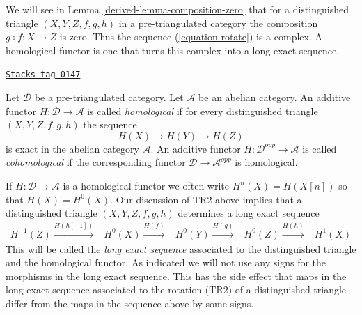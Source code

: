 \medskip\noindent
We will see in
Lemma \ref{derived-lemma-composition-zero}
that for a distinguished triangle $(X, Y, Z, f, g, h)$
in a pre-triangulated category the composition $g \circ f : X \to Z$ is zero.
Thus the sequence (\ref{equation-rotate}) is a complex.
A homological functor is one that turns this complex into a long
exact sequence.

\begin{definition}[Homological]
\label{derived-definition-homological}
\href{https://stacks.math.columbia.edu/tag/0147}{\texttt{Stacks tag 0147}}

Let $\mathcal{D}$ be a pre-triangulated category.
Let $\mathcal{A}$ be an abelian category.
An additive functor $H : \mathcal{D} \to \mathcal{A}$ is called
{\it homological} if for every distinguished triangle
$(X, Y, Z, f, g, h)$ the sequence
$$
H(X) \to H(Y) \to H(Z)
$$
is exact in the abelian category $\mathcal{A}$. An additive functor
$H : \mathcal{D}^{opp} \to \mathcal{A}$ is called {\it cohomological}
if the corresponding functor $\mathcal{D} \to \mathcal{A}^{opp}$ is
homological.
\end{definition}

If $H : \mathcal{D} \to \mathcal{A}$ is a homological functor
we often write $H^n(X) = H(X[n])$ so that $H(X) = H^0(X)$.
Our discussion of TR2 above implies that a distinguished triangle
$(X, Y, Z, f, g, h)$ determines a long exact sequence
\begin{equation}
\label{equation-long-exact-cohomology-sequence}
\begin{array}{ccccc}H^{-1}(Z) \overset{H(h[-1])}{\longrightarrow} & H^0(X) \overset{H(f)}{\longrightarrow} & H^0(Y) \overset{H(g)}{\longrightarrow} & H^0(Z) \overset{H(h)}{\longrightarrow} & H^1(X)\end{array}
\end{equation}
This will be called the {\it long exact sequence} associated to the
distinguished triangle and the homological functor. As indicated
we will not use any signs for the morphisms in the long exact
sequence. This has the side effect that maps in the long exact sequence
associated to the rotation (TR2) of a distinguished triangle differ
from the maps in the sequence above by some signs.

